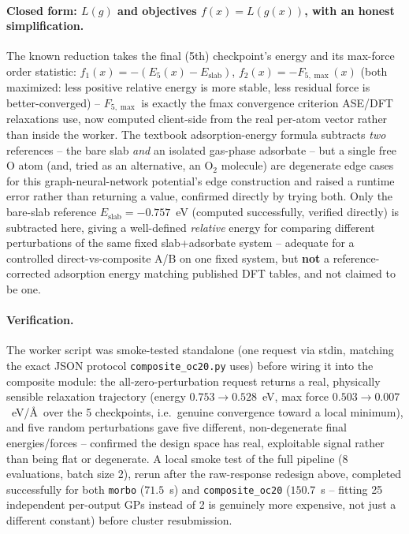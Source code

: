 \documentclass[11pt]{article}
\begin{document}
\paragraph{Closed form: $L(g)$ and objectives $f(x)=L(g(x))$, with an
honest simplification.} The known reduction takes the final (5th)
checkpoint's energy and its max-force order statistic:
$f_1(x) = -(E_5(x) - E_{\text{slab}})$, $f_2(x) = -F_{5,\max}(x)$ (both
maximized: less positive relative energy is more stable, less residual
force is better-converged) -- $F_{5,\max}$ is exactly the fmax
convergence criterion ASE/DFT relaxations use, now computed client-side
from the real per-atom vector rather than inside the worker. The
textbook adsorption-energy formula subtracts \emph{two} references --
the bare slab \emph{and} an isolated gas-phase adsorbate -- but a
single free O atom (and, tried as an alternative, an O$_2$ molecule)
are degenerate edge cases for this graph-neural-network potential's
edge construction and raised a runtime error rather than returning a
value, confirmed directly by trying both. Only the bare-slab reference
$E_{\text{slab}} = -0.757$~eV (computed successfully, verified directly)
is subtracted here, giving a well-defined \emph{relative} energy for
comparing different perturbations of the same fixed slab+adsorbate
system -- adequate for a controlled direct-vs-composite A/B on one
fixed system, but \textbf{not} a reference-corrected adsorption energy
matching published DFT tables, and not claimed to be one.

\paragraph{Verification.} The worker script was smoke-tested standalone
(one request via stdin, matching the exact JSON protocol
\texttt{composite\_oc20.py} uses) before wiring it into the composite
module: the all-zero-perturbation request returns a real, physically
sensible relaxation trajectory (energy $0.753 \to 0.528$~eV, max force
$0.503 \to 0.007$~eV/\AA\ over the 5 checkpoints, i.e.\ genuine
convergence toward a local minimum), and five random perturbations gave
five different, non-degenerate final energies/forces -- confirmed the
design space has real, exploitable signal rather than being flat or
degenerate. A local smoke test of the full pipeline (8 evaluations,
batch size 2), rerun after the raw-response redesign above, completed
successfully for both \texttt{morbo} ($71.5$~s) and
\texttt{composite\_oc20} ($150.7$~s -- fitting 25 independent
per-output GPs instead of 2 is genuinely more expensive, not just a
different constant) before cluster resubmission.
\end{document}
